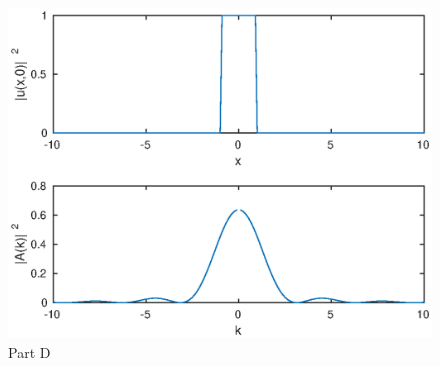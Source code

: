 \documentclass[a4paper,11pt]{article}
\numberwithin{equation}{section}
\begin{document}
\begin{figure}[p]
 \caption{Part D}
 \centering
   \includegraphics[width=\textwidth]{d}
\end{figure}
\end{document}
